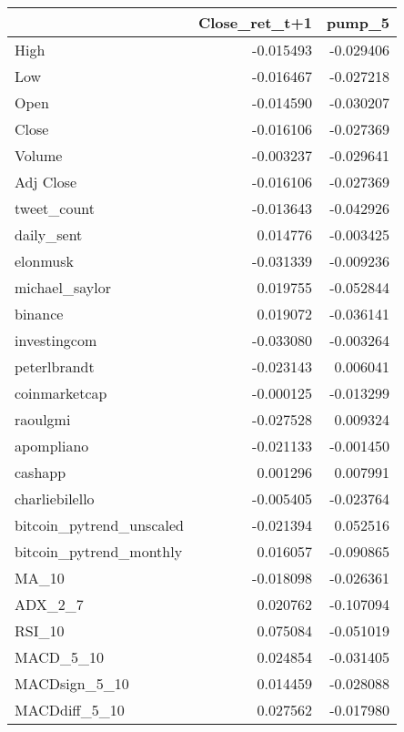 \begin{tabular}{lrr}
\toprule
{} &  Close\_ret\_t+1 &    pump\_5 \\
\midrule
High                     &      -0.015493 & -0.029406 \\
Low                      &      -0.016467 & -0.027218 \\
Open                     &      -0.014590 & -0.030207 \\
Close                    &      -0.016106 & -0.027369 \\
Volume                   &      -0.003237 & -0.029641 \\
Adj Close                &      -0.016106 & -0.027369 \\
tweet\_count              &      -0.013643 & -0.042926 \\
daily\_sent               &       0.014776 & -0.003425 \\
elonmusk                 &      -0.031339 & -0.009236 \\
michael\_saylor           &       0.019755 & -0.052844 \\
binance                  &       0.019072 & -0.036141 \\
investingcom             &      -0.033080 & -0.003264 \\
peterlbrandt             &      -0.023143 &  0.006041 \\
coinmarketcap            &      -0.000125 & -0.013299 \\
raoulgmi                 &      -0.027528 &  0.009324 \\
apompliano               &      -0.021133 & -0.001450 \\
cashapp                  &       0.001296 &  0.007991 \\
charliebilello           &      -0.005405 & -0.023764 \\
bitcoin\_pytrend\_unscaled &      -0.021394 &  0.052516 \\
bitcoin\_pytrend\_monthly  &       0.016057 & -0.090865 \\
MA\_10                    &      -0.018098 & -0.026361 \\
ADX\_2\_7                  &       0.020762 & -0.107094 \\
RSI\_10                   &       0.075084 & -0.051019 \\
MACD\_5\_10                &       0.024854 & -0.031405 \\
MACDsign\_5\_10            &       0.014459 & -0.028088 \\
MACDdiff\_5\_10            &       0.027562 & -0.017980 \\

\end{tabular}
